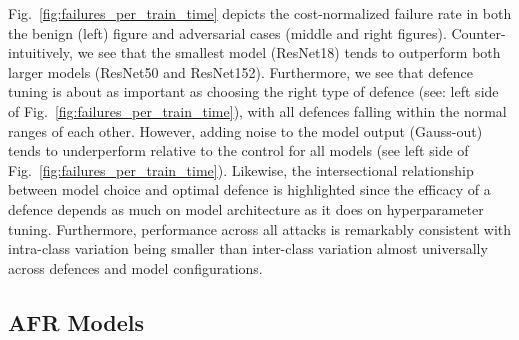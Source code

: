
Fig.~\ref{fig:failures_per_train_time} depicts the cost-normalized failure rate in both the benign (left) figure and adversarial cases (middle and right figures). Counter-intuitively, we see that the smallest model (ResNet18) tends to outperform both larger models (ResNet50 and ResNet152). Furthermore, we see that defence tuning is about as important as choosing the right type of defence (see: left side of Fig.~\ref{fig:failures_per_train_time}), with all defences falling within the normal ranges of each other. However, adding noise to the model output (Gauss-out) tends to underperform relative to the control for all models (see left side of Fig.~\ref{fig:failures_per_train_time}). Likewise, the intersectional relationship between model choice and optimal defence is highlighted since the efficacy of a defence depends as much on model architecture as it does on hyperparameter tuning.  Furthermore, performance across all attacks is remarkably consistent with intra-class variation being smaller than inter-class variation almost universally across defences and model configurations.



\subsection{AFR Models}

